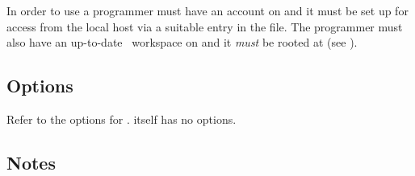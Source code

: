 In order to use  a programmer must have an account on
 and it must be set up for  access from the
local host via a suitable entry in the  file.  The programmer
must also have an up-to-date \aipspp\ workspace on  and
it \emph{must} be  rooted at  (see ).
 
\subsection*{Options}
 
Refer to the options for .   itself has no options.
 
\subsection*{Notes}
 
